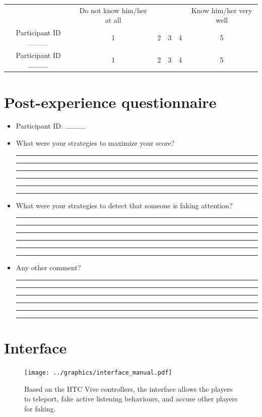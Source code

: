 \documentclass[]{simple-thesis}
\begin{document}
\begin{appendices}
\begin{itemize}
\begin{tabular}{c|C C C C C}
  & Do not know him/her at all & & & & Know him/her very well \\
  Participant ID $\rule{1cm}{0.1mm}$ & 1 & 2 & 3 & 4 & 5\\
  Participant ID $\rule{1cm}{0.1mm}$ & 1 & 2 & 3 & 4 & 5\\
\end{tabular}

\end{itemize}


\chapter{Post-experience questionnaire}\label{appendix:questionnaire:post}

\begin{itemize}

\item Participant ID: $\rule{1cm}{0.1mm}$

\item What were your strategies to maximize your score?

  \rule{\linewidth}{0.1mm}
  \rule{\linewidth}{0.1mm}
  \rule{\linewidth}{0.1mm}
  \rule{\linewidth}{0.1mm}
  \rule{\linewidth}{0.1mm}
  \rule{\linewidth}{0.1mm}

\item What were your strategies to detect that someone is faking attention?

  \rule{\linewidth}{0.1mm}
  \rule{\linewidth}{0.1mm}
  \rule{\linewidth}{0.1mm}
  \rule{\linewidth}{0.1mm}
  \rule{\linewidth}{0.1mm}
  \rule{\linewidth}{0.1mm}

\item Any other comment?

  \rule{\linewidth}{0.1mm}
  \rule{\linewidth}{0.1mm}
  \rule{\linewidth}{0.1mm}
  \rule{\linewidth}{0.1mm}
  \rule{\linewidth}{0.1mm}
  \rule{\linewidth}{0.1mm}

\end{itemize}


\chapter{Interface}\label{appendix:interface}

\begin{figure}[H]
  \texttt{[image: ../graphics/interface\_manual.pdf]}
  \caption{Based on the HTC Vive controllers, the interface allows the players to teleport, fake active listening behaviours, and accuse other players for faking.}
  \label{fig:interface}
\end{figure}


\end{appendices}
\end{document}
